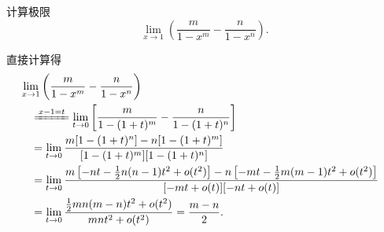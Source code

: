 \begin{example}
计算极限\begin{equation*}
	\lim_{x\to1} \left(\frac{m}{1-x^m} - \frac{n}{1-x^n}\right).
\end{equation*}
\begin{solution}
直接计算得
\begin{align*}
	&\hspace{-10pt}
	\lim_{x\to1} \left(\frac{m}{1-x^m} - \frac{n}{1-x^n}\right) \\
	&\xlongequal{x-1=t}
	\lim_{t\to0} \left[\frac{m}{1-(1+t)^m}-\frac{n}{1-(1+t)^n}\right] \\
	&=
	\lim_{t\to0} \frac{m[1-(1+t)^n]-n[1-(1+t)^m]}{[1-(1+t)^m][1-(1+t)^n]} \\
	&=
	\lim_{t\to0} \frac{m\left[-nt-\frac{1}{2}n(n-1)t^2+o(t^2)\right]
		-n\left[-mt-\frac{1}{2}m(m-1)t^2+o(t^2)\right]}{[-mt+o(t)][-nt+o(t)]} \\
	&=
	\lim_{t\to0} \frac{\frac{1}{2}mn(m-n)t^2+o(t^2)}{mnt^2+o(t^2)}
	= \frac{m-n}{2}.
\end{align*}
\end{solution}
\end{example}


